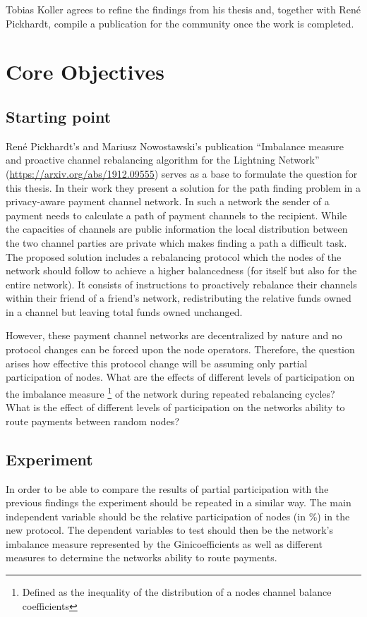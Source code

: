 \documentclass[final]{fhnwreport}       %
\begin{document}
Tobias Koller agrees to refine the findings from his thesis and, together with René Pickhardt, compile a publication for the community once the work is completed.  

\section{Core Objectives}
\subsection{Starting point}
René Pickhardt's and Mariusz Nowostawski's publication ``Imbalance measure and proactive channel rebalancing algorithm for the Lightning Network'' (\url{https://arxiv.org/abs/1912.09555}) serves as a base to formulate the question for this thesis. In their work they present a solution for the path finding problem in a privacy-aware payment channel network. In such a network the sender of a payment needs to calculate a path of payment channels to the recipient. While the capacities of channels are public information the local distribution between the two channel parties are private which makes finding a path a difficult task. The proposed solution includes a rebalancing protocol which the nodes of the network should follow to achieve a higher balancedness (for itself but also for the entire network). It consists of instructions to proactively rebalance their channels within their friend of a friend's network, redistributing the relative funds owned in a channel but leaving total funds owned unchanged.

However, these payment channel networks are decentralized by nature and no protocol changes can be forced upon the node operators. Therefore, the question arises how effective this protocol change will be assuming only partial participation of nodes. What are the effects of different levels of participation on the imbalance measure \footnote{Defined as the inequality of the distribution of a nodes channel balance coefficients} of the network during repeated rebalancing cycles? What is the effect of different levels of participation on the networks ability to route payments between random nodes?

\subsection{Experiment}
In order to be able to compare the results of partial participation with the previous findings the experiment should be repeated in a similar way. The main independent variable should be the relative participation of nodes (in \%) in the new protocol. The dependent variables to test should then be the network's imbalance measure represented by the Ginicoefficients as well as different measures to determine the networks ability to route payments. 
\end{document}
